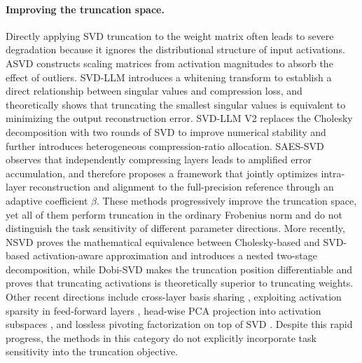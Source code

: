 \documentclass[a4paper,fleqn]{cas-dc}
\begin{document}
\paragraph{Improving the truncation space.}
Directly applying SVD truncation to the weight matrix often leads to severe degradation because it ignores the distributional structure of input activations. ASVD \citep{yuan2023asvd} constructs scaling matrices from activation magnitudes to absorb the effect of outliers. SVD-LLM \citep{wang2025svdllm} introduces a whitening transform to establish a direct relationship between singular values and compression loss, and theoretically shows that truncating the smallest singular values is equivalent to minimizing the output reconstruction error. SVD-LLM V2 \citep{wang2025svdllmv2} replaces the Cholesky decomposition with two rounds of SVD to improve numerical stability and further introduces heterogeneous compression-ratio allocation. SAES-SVD \citep{saessvd2025} observes that independently compressing layers leads to amplified error accumulation, and therefore proposes a framework that jointly optimizes intra-layer reconstruction and alignment to the full-precision reference through an adaptive coefficient $\beta$. These methods progressively improve the truncation space, yet all of them perform truncation in the ordinary Frobenius norm and do not distinguish the task sensitivity of different parameter directions. More recently, NSVD \citep{lu2025nsvd} proves the mathematical equivalence between Cholesky-based and SVD-based activation-aware approximation and introduces a nested two-stage decomposition, while Dobi-SVD \citep{wang2025dobisvd} makes the truncation position differentiable and proves that truncating activations is theoretically superior to truncating weights. Other recent directions include cross-layer basis sharing \citep{wang2024basissharing}, exploiting activation sparsity in feed-forward layers \citep{huang2025sola}, head-wise PCA projection into activation subspaces \citep{tian2025flatllm}, and lossless pivoting factorization on top of SVD \citep{zhao2025pifa}. Despite this rapid progress, the methods in this category do not explicitly incorporate task sensitivity into the truncation objective.
\end{document}
